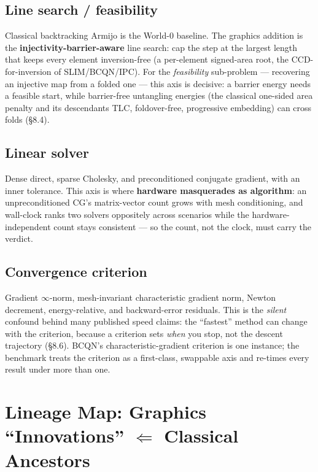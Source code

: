 \documentclass{egpubl}
\begin{document}
\subsection{Line search / feasibility}

Classical backtracking Armijo is the World-0 baseline. The graphics addition is the
\textbf{injectivity-barrier-aware} line search: cap the step at the largest length that keeps every element
inversion-free (a per-element signed-area root, the CCD-for-inversion of SLIM/BCQN/IPC). For the
\emph{feasibility} sub-problem --- recovering an injective map from a folded one --- this axis is decisive: a
barrier energy needs a feasible start, while barrier-free untangling energies (the classical one-sided
area penalty and its descendants TLC, foldover-free, progressive embedding) can cross folds (\S8.4).

\subsection{Linear solver}

Dense direct, sparse Cholesky, and preconditioned conjugate gradient, with an inner tolerance. This
axis is where \textbf{hardware masquerades as algorithm}: an unpreconditioned CG's matrix-vector count
grows with mesh conditioning, and wall-clock ranks two solvers oppositely across scenarios while the
hardware-independent count stays consistent --- so the count, not the clock, must carry the verdict.

\subsection{Convergence criterion}

Gradient $\infty$-norm, mesh-invariant characteristic gradient norm, Newton decrement, energy-relative, and
backward-error residuals. This is the \emph{silent} confound behind many published speed claims: the
``fastest'' method can change with the criterion, because a criterion sets \emph{when} you stop, not the
descent trajectory (\S8.6). BCQN's characteristic-gradient criterion is one instance; the benchmark
treats the criterion as a first-class, swappable axis and re-times every result under more than one.


\section{Lineage Map: Graphics ``Innovations'' $\Leftarrow$ Classical Ancestors}
\end{document}
